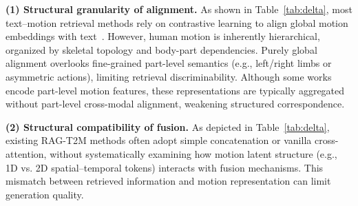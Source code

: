 \documentclass[10pt,journal,compsoc]{IEEEtran}
\begin{document}








        




\textbf{(1) Structural granularity of alignment.}  
As shown in Table~\ref{tab:delta}, most text–motion retrieval methods rely on contrastive learning to align global motion embeddings with text~\cite{tmr,temos}. However, human motion is inherently hierarchical, organized by skeletal topology and body-part dependencies. Purely global alignment overlooks fine-grained part-level semantics (e.g., left/right limbs or asymmetric actions), limiting retrieval discriminability. Although some works~\cite{remogpt,parco} encode part-level motion features, these representations are typically aggregated without part-level cross-modal alignment, weakening structured correspondence.

\textbf{(2) Structural compatibility of fusion.}  
As depicted in Table~\ref{tab:delta}, existing RAG-T2M methods often adopt simple concatenation or vanilla cross-attention, without systematically examining how motion latent structure (e.g., 1D vs. 2D spatial–temporal tokens) interacts with fusion mechanisms. This mismatch between retrieved information and motion representation can limit generation quality.
\end{document}
